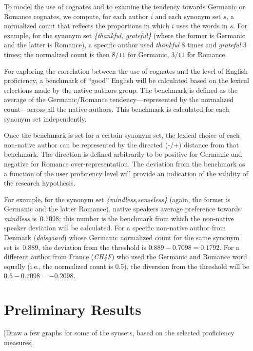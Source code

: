 \documentclass[11pt]{article}
\newcommand{\textnl}{\textsl}
\newcommand{\note}[1]{\textit{\small\color{magenta}{#1}}}
\begin{document}
To model the use of cognates and to examine the tendency towards Germanic or Romance cognates, we compute, for each author $i$ and each synonym set $s$, a normalized count that reflects the proportions in which $i$ uses the words in $s$. 
For example, for the synonym set \textnl{\{thankful, grateful\}} (where the former is Germanic and the latter is Romance), a specific author used \textnl{thankful} 8 times and \textnl{grateful} 3 times; the normalized count is then $8/11$ for Germanic, $3/11$ for Romance. 

For exploring the correlation between the use of cognates and the level of English proficiency, a benchmark of ``good'' English will be calculated based on the lexical selections made by the native authors group. The benchmark is defined as the average of the Germanic/Romance tendency---represented by the normalized count---across all the native authors. This benchmark is calculated for each synonym set independently. 

Once the benchmark is set for a certain synonym set, the lexical choice of each non-native author can be represented by the directed (-/+) distance from that benchmark. The direction is defined arbitrarily to be positive for Germanic and negative for Romance over-representation.  The deviation from the benchmark as a function of the user proficiency level will provide an indication of the validity of the research hypothesis. 

For example, for the synonym set \textnl{\{mindless,senseless\}} (again, the former is Germanic and the latter Romance), native speakers average preference towards \textnl{mindless} is~0.7098; this number is the benchmark from which the non-native speaker deviation will be calculated. For a specific non-native author from Denmark (\textit{dalsgaard}) whose Germanic normalized count for the same synonym set is~0.889, the deviation from the threshold is $0.889-0.7098 = 0.1792$. For a different author from France (\textit{CH4F}) who used the Germanic and Romance word equally (i.e., the normalized count is 0.5), the diversion from the threshold will be $0.5 - 0.7098  = -0.2098$.

\note{And then what? What will you do with these distances? You don't have to know all the details, but provide at least the general idea.}

\section{Preliminary Results}

[Draw a few graphs for some of the synsets, based on the selected proficiency measures]




\end{document}
